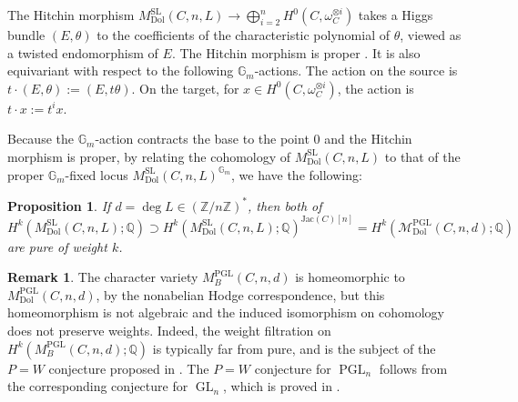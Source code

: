 \documentclass[11pt,reqno]{amsart}
\theoremstyle{plain} %
\newtheorem{prop}[theorem]{Proposition}
\theoremstyle{definition}
\newtheorem{remark}[theorem]{Remark}
\newcommand{\QQ}{\mathbb{Q}}
\newcommand{\M}{\mathcal{M}}
\newcommand{\ZZ}{\mathbb{Z}}
\DeclareMathOperator{\GL}{GL}
\DeclareMathOperator{\SL}{SL}
\DeclareMathOperator{\PGL}{PGL}
\newcommand{\Dol}{\mathrm{Dol}}
\newcommand{\Jac}{\mathrm{Jac}}
\renewcommand{\AA}{\mathbb{A}}
\begin{document}
The Hitchin morphism $M^{\SL}_{\Dol}(C,n,L) \to \bigoplus_{i=2}^n H^0(C, \omega_C^{\otimes i})$ takes a Higgs bundle $(E,\theta)$ to the coefficients of the characteristic polynomial of $\theta$, viewed as a twisted endomorphism of $E$. The Hitchin morphism is proper \cite[Theorem 6.11]{Simpson-reps2}. It is also equivariant with respect to the following $\mathbb{G}_m$-actions. The action on the source is $t \cdot (E, \theta) := (E, t\theta)$. On the target, for $x \in H^0(C, \omega_C^{\otimes i})$, the action is $t \cdot x := t^i x$. 

Because the $\mathbb{G}_m$-action contracts the base to the point 0 and the Hitchin morphism is proper, by relating the cohomology of $M^{\SL}_{\Dol}(C,n,L)$ to that of the proper $\mathbb{G}_m$-fixed locus $M_{\Dol}^{\SL}(C,n,L)^{\mathbb{G}_m}$, we have the following:

\begin{prop} \label{prop: purity}
\cite[Corollary~1.3.2]{Semiprojective}
If $d = \deg L \in (\ZZ/n\ZZ)^*$, then both of
$$H^k(M^{\SL}_{\Dol}(C,n,L); \QQ) \supset H^k(M^{\SL}_{\Dol}(C,n,L); \QQ)^{\Jac(C)[n]} = H^k(\M^{\PGL}_{\Dol}(C,n,d); \QQ)$$
are pure of weight $k$.
\end{prop}

\begin{remark}
The character variety $M_B^{\PGL}(C,n,d)$ is homeomorphic to $M^{\PGL}_{\Dol}(C,n,d)$, by the nonabelian Hodge correspondence, but this homeomorphism is not algebraic and the induced isomorphism on cohomology does not preserve weights.  Indeed, the weight filtration on $H^k(M_B^{\PGL}(C,n,d);\QQ)$ is typically far from pure, and is the subject of the $P=W$ conjecture proposed in \cite{PW}. The $P=W$ conjecture for $\PGL_n$ follows from the corresponding conjecture for $\GL_n$, which is proved in \cite{MS, HMMS}.
\end{remark}
\end{document}
